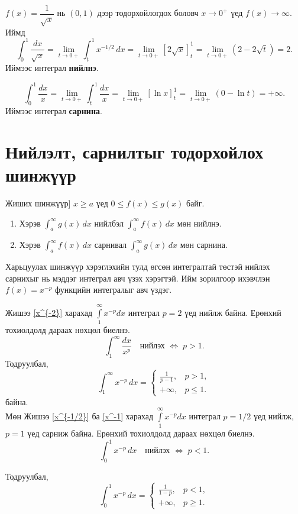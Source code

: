 \begin{example}\label{x^{-1/2}}
$f(x) = \dfrac{1}{\sqrt{x}}$ нь $(0,1)$ дээр тодорхойлогдох боловч $x\to 0^{+}$ үед $f(x)\to\infty$.
Иймд 
\[
\int_{0}^{1}\frac{dx}{\sqrt{x}}
= \lim_{t\to0+}\int_{t}^{1} x^{-1/2}\,dx
= \lim_{t\to0+}\left[2\sqrt{x}\right]_{t}^{1}
= \lim_{t\to0+}(2 - 2\sqrt{t})
= 2.
\]
Иймээс интеграл \textbf{нийлнэ}.
\end{example}

\begin{example}\label{x^-1}
\[
\int_{0}^{1}\frac{dx}{x}
= \lim_{t\to0+}\int_{t}^{1} \frac{dx}{x}
= \lim_{t\to0+} [\ln x]_{t}^{1}
= \lim_{t\to0+}(0 - \ln t)
= +\infty.
\]
Иймээс интеграл \textbf{сарнина}.
\end{example}

\section{Нийлэлт, сарнилтыг тодорхойлох шинжүүр}

\begin{theorem}Жиших шинжүүр]
$x\ge a$ үед $0\le f(x)\le g(x)$ байг.

\begin{enumerate}
\item Хэрэв $\displaystyle\int_{a}^{\infty} g(x)\,dx$ нийлбэл  
\quad $\displaystyle\int_{a}^{\infty} f(x)\,dx$ мөн нийлнэ.
\item Хэрэв $\displaystyle\int_{a}^{\infty} f(x)\,dx$ сарнивал  
\quad $\displaystyle\int_{a}^{\infty} g(x)\,dx$ мөн сарнина.
\end{enumerate}
\end{theorem}
Харьцуулах шинжүүр хэрэглэхийн тулд өгсөн интегралтай төстэй нийлэх сарнихыг нь мэддэг интеграл авч үзэх хэрэгтэй. Ийм зорилгоор ихэвчлэн $f(x)=x^{-p}$ функцийн интегралыг авч үздэг.
\begin{example}
 Жишээ \ref{x^{-2}} харахад $\displaystyle\int\limits_1^{\infty}x^{-p}dx$ интеграл $p=2$ үед нийлж байна. Ерөнхий тохиолдолд дараах нөхцөл биелнэ.
 \[
\int_{1}^{\infty} \frac{dx}{x^{p}}
\quad\text{нийлэх } \Longleftrightarrow\; p>1.
\]
Тодруулбал,
\[
\int_{1}^{\infty} x^{-p}\,dx =
\begin{cases}
\displaystyle \frac{1}{p-1}, & p>1,\\[4pt]
+\infty, & p\le1.
\end{cases}
\] байна. \\
Мөн Жишээ \ref{x^{-1/2}} ба  \ref{x^-1}  харахад $\displaystyle\int\limits_1^{\infty}x^{-p} dx$ интеграл $p= 1/2$ үед нийлж, $p=1$ үед сарниж байна. Ерөнхий тохиолдолд дараах нөхцөл биелнэ.
 \[
\int_{0}^{1} x^{-p}\,dx
\quad\text{нийлэх } \Longleftrightarrow\; p<1.
\]

Тодруулбал,
\[
\int_{0}^{1} x^{-p}\,dx =
\begin{cases}
\displaystyle \frac{1}{1-p}, & p<1,\\[4pt]
+\infty, & p\ge1.
\end{cases}
\]
\end{example}

